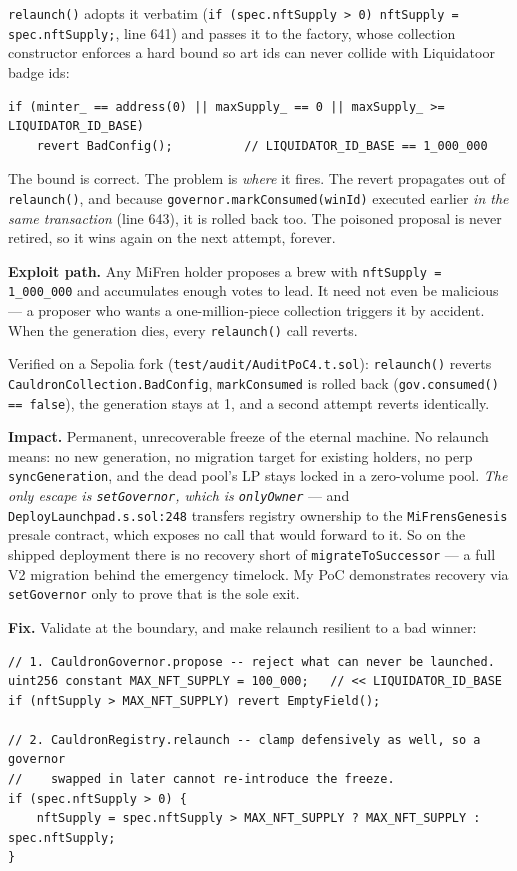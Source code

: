 \documentclass[10pt,a4paper]{article}
\newcommand{\code}[1]{\texttt{\small #1}}
\begin{document}
\noindent \code{relaunch()} adopts it verbatim (\code{if (spec.nftSupply > 0)
nftSupply = spec.nftSupply;}, line 641) and passes it to the factory, whose
collection constructor enforces a hard bound so art ids can never collide with
Liquidatoor badge ids:

\begin{lstlisting}[firstnumber=126]
if (minter_ == address(0) || maxSupply_ == 0 || maxSupply_ >= LIQUIDATOR_ID_BASE)
    revert BadConfig();          // LIQUIDATOR_ID_BASE == 1_000_000
\end{lstlisting}

\noindent The bound is correct. The problem is \emph{where} it fires. The revert
propagates out of \code{relaunch()}, and because \code{governor.markConsumed(winId)}
executed earlier \emph{in the same transaction} (line 643), it is rolled back
too. The poisoned proposal is never retired, so it wins again on the next
attempt, forever.

\textbf{Exploit path.} Any MiFren holder proposes a brew with
\code{nftSupply = 1\_000\_000} and accumulates enough votes to lead. It need not
even be malicious --- a proposer who wants a one-million-piece collection
triggers it by accident. When the generation dies, every \code{relaunch()} call
reverts.

\noindent Verified on a Sepolia fork
(\code{test/audit/AuditPoC4.t.sol}): \code{relaunch()} reverts
\code{CauldronCollection.BadConfig}, \code{markConsumed} is rolled back
(\code{gov.consumed() == false}), the generation stays at 1, and a second
attempt reverts identically.

\textbf{Impact.} Permanent, unrecoverable freeze of the eternal machine. No
relaunch means: no new generation, no migration target for existing holders, no
perp \code{syncGeneration}, and the dead pool's LP stays locked in a
zero-volume pool. \emph{The only escape is \code{setGovernor}, which is
\code{onlyOwner}} --- and \code{DeployLaunchpad.s.sol:248} transfers registry
ownership to the \code{MiFrensGenesis} presale contract, which exposes no call
that would forward to it. So on the shipped deployment there is no recovery
short of \code{migrateToSuccessor} --- a full V2 migration behind the emergency
timelock. My PoC demonstrates recovery via \code{setGovernor} only to prove that
is the sole exit.

\textbf{Fix.} Validate at the boundary, and make relaunch resilient to a bad
winner:

\begin{lstlisting}[numbers=none]
// 1. CauldronGovernor.propose -- reject what can never be launched.
uint256 constant MAX_NFT_SUPPLY = 100_000;   // << LIQUIDATOR_ID_BASE
if (nftSupply > MAX_NFT_SUPPLY) revert EmptyField();

// 2. CauldronRegistry.relaunch -- clamp defensively as well, so a governor
//    swapped in later cannot re-introduce the freeze.
if (spec.nftSupply > 0) {
    nftSupply = spec.nftSupply > MAX_NFT_SUPPLY ? MAX_NFT_SUPPLY : spec.nftSupply;
}
\end{lstlisting}
\end{document}
